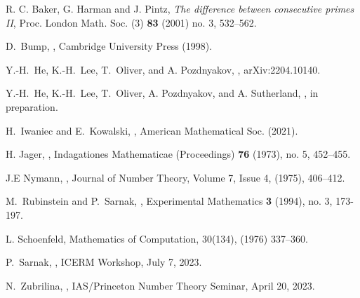 \documentclass{amsart}
\theoremstyle{definition}
\numberwithin{equation}{section}
\begin{document}
\begin{thebibliography}{CERP}%
R. C. Baker, G. Harman and J. Pintz,
     {\em The difference between consecutive primes {II}},
   {Proc. London Math. Soc. (3)} {\bf 83} {(2001)} {no. 3}, {532--562}.

D.~Bump, 
, 
\newblock Cambridge University Press (1998).

Y.-H.~He, K.-H.~Lee, T.~Oliver, and A. Pozdnyakov,
, 
\newblock arXiv:2204.10140.

Y.-H.~He, K.-H.~Lee, T.~Oliver, A. Pozdnyakov, and A. Sutherland,
, 
\newblock in preparation. 

H.~Iwaniec and E.~Kowalski, 
, 
\newblock American Mathematical Soc. (2021).


H. Jager,
, Indagationes Mathematicae (Proceedings) {\bf 76} (1973), no. 5, 452--455.

J.E Nymann,
,
Journal of Number Theory,
Volume 7, Issue 4,
(1975), 406--412.

M.~Rubinstein and P.~Sarnak,
, Experimental Mathematics {\bf 3} (1994), no. 3, 173-197.

L. Schoenfeld,  Mathematics of Computation, 30(134), (1976) 337–360. 

P.~Sarnak, , ICERM Workshop, July 7, 2023.

 N.~Zubrilina, , IAS/Princeton Number Theory Seminar, April 20, 2023.

\end{thebibliography}
\end{document}
